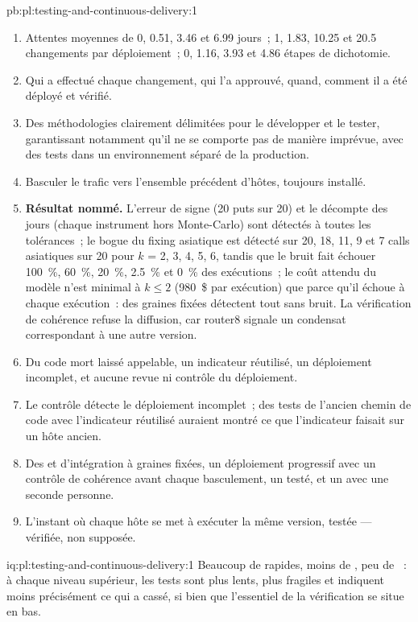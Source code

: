 \begin{solution}{pb:pl:testing-and-continuous-delivery:1}
\begin{enumerate}
\item Attentes moyennes de 0, 0.51, 3.46 et 6.99 jours~; 1, 1.83, 10.25 et 20.5 changements par déploiement~; 0, 1.16, 3.93 et 4.86 étapes de dichotomie.
\item Qui a effectué chaque changement, qui l'a approuvé, quand, comment il a été déployé et vérifié.
\item Des méthodologies clairement délimitées pour le développer et le tester, garantissant notamment qu'il ne se comporte pas de manière imprévue,
avec des tests dans un environnement séparé de la production.
\item Basculer le trafic vers l'ensemble précédent d'hôtes, toujours installé.
\item \textbf{Résultat nommé.} L'erreur de signe (20 puts sur 20) et le décompte des jours (chaque instrument hors Monte-Carlo) sont détectés
à toutes les tolérances~; le bogue du fixing asiatique est détecté sur 20, 18, 11, 9 et 7 calls asiatiques sur 20 pour $k$ = 2, 3, 4, 5, 6, tandis que le bruit fait échouer 100~\%, 60~\%, 20~\%,
2.5~\% et 0~\% des exécutions~; le coût attendu du modèle n'est minimal à $k\le2$ (980~\$ par exécution) que parce qu'il échoue à chaque exécution~: des graines fixées détectent tout
sans bruit. La vérification de cohérence refuse la diffusion, car router8 signale un condensat correspondant à une autre version.
\item Du code mort laissé appelable, un indicateur réutilisé, un déploiement incomplet, et aucune revue ni contrôle du déploiement.
\item Le contrôle détecte le déploiement incomplet~; des tests de l'ancien chemin de code avec l'indicateur réutilisé auraient montré ce que l'indicateur faisait sur un
hôte ancien.
\item Des  et d'intégration à graines fixées, un déploiement progressif avec un contrôle de cohérence avant chaque basculement, un  testé, et un 
avec une seconde personne.
\item L'instant où chaque hôte se met à exécuter la même version, testée --- vérifiée, non supposée.
\end{enumerate}
\end{solution}

\begin{solution}{iq:pl:testing-and-continuous-delivery:1}
Beaucoup de  rapides, moins de , peu de ~: à chaque niveau supérieur, les tests sont plus lents, plus fragiles et indiquent moins précisément ce qui a cassé,
si bien que l'essentiel de la vérification se situe en bas.
\end{solution}

